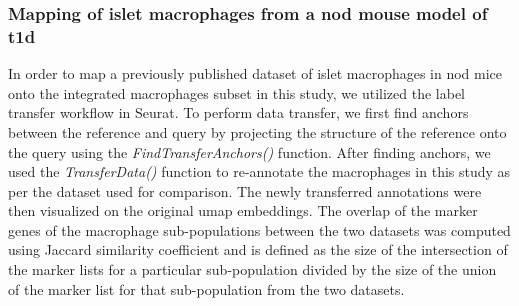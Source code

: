 \subsubsection{\large Mapping of islet macrophages from a \gls{nod} mouse model of \gls{t1d}}
\label{subsubsec:met_chp2_labeltransfer}
In order to map a previously published dataset of islet macrophages in \gls{nod} mice \textbf{\cite{zakharov_single-cell_2020}} onto the integrated macrophages subset in this study, we utilized the label transfer workflow in Seurat. To perform data transfer, we first find anchors between the reference and query by projecting the  structure of the reference onto the query using the \textit{FindTransferAnchors()} function. After finding anchors, we used the \textit{TransferData()} function to re-annotate the macrophages in this study as per the dataset used for comparison. The newly transferred annotations were then visualized on the original \gls{umap} embeddings. The overlap of the marker genes of the macrophage sub-populations between the two datasets was computed using Jaccard similarity coefficient and is defined as the size of the intersection of the marker lists for a particular sub-population divided by the size of the union of the marker list for that sub-population from the two datasets.



